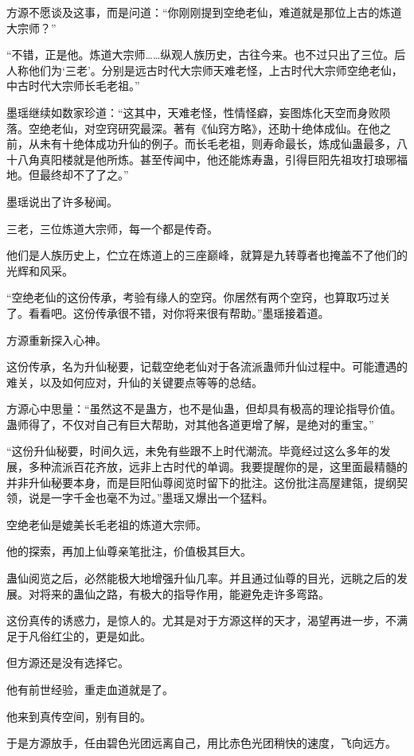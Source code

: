 \begin{this_body}
方源不愿谈及这事，而是问道：“你刚刚提到空绝老仙，难道就是那位上古的炼道大宗师？”

“不错，正是他。炼道大宗师……纵观人族历史，古往今来。也不过只出了三位。后人称他们为‘三老’。分别是远古时代大宗师天难老怪，上古时代大宗师空绝老仙，中古时代大宗师长毛老祖。”

墨瑶继续如数家珍道：“这其中，天难老怪，性情怪癖，妄图炼化天空而身败陨落。空绝老仙，对空窍研究最深。著有《仙窍方略》，还助十绝体成仙。在他之前，从未有十绝体成功升仙的例子。而长毛老祖，则寿命最长，炼成仙蛊最多，八十八角真阳楼就是他所炼。甚至传闻中，他还能炼寿蛊，引得巨阳先祖攻打琅琊福地。但最终却不了了之。”

墨瑶说出了许多秘闻。

三老，三位炼道大宗师，每一个都是传奇。

他们是人族历史上，伫立在炼道上的三座巅峰，就算是九转尊者也掩盖不了他们的光辉和风采。

“空绝老仙的这份传承，考验有缘人的空窍。你居然有两个空窍，也算取巧过关了。看看吧。这份传承很不错，对你将来很有帮助。”墨瑶接着道。

方源重新探入心神。

这份传承，名为升仙秘要，记载空绝老仙对于各流派蛊师升仙过程中。可能遭遇的难关，以及如何应对，升仙的关键要点等等的总结。

方源心中思量：“虽然这不是蛊方，也不是仙蛊，但却具有极高的理论指导价值。蛊师得了，不仅对自己有巨大帮助，对其他各道更增了解，是绝对的重宝。”

“这份升仙秘要，时间久远，未免有些跟不上时代潮流。毕竟经过这么多年的发展，多种流派百花齐放，远非上古时代的单调。我要提醒你的是，这里面最精髓的并非升仙秘要本身，而是巨阳仙尊阅览时留下的批注。这份批注高屋建瓴，提纲契领，说是一字千金也毫不为过。”墨瑶又爆出一个猛料。

空绝老仙是媲美长毛老祖的炼道大宗师。

他的探索，再加上仙尊亲笔批注，价值极其巨大。

蛊仙阅览之后，必然能极大地增强升仙几率。并且通过仙尊的目光，远眺之后的发展。对将来的蛊仙之路，有极大的指导作用，能避免走许多弯路。

这份真传的诱惑力，是惊人的。尤其是对于方源这样的天才，渴望再进一步，不满足于凡俗红尘的，更是如此。

但方源还是没有选择它。

他有前世经验，重走血道就是了。

他来到真传空间，别有目的。

于是方源放手，任由碧色光团远离自己，用比赤色光团稍快的速度，飞向远方。


\end{this_body}
